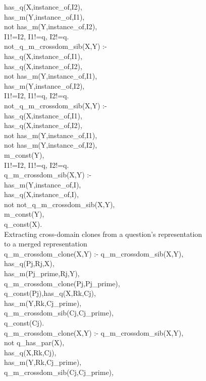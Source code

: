 has\_q(X,instance\_of,I2),\\
has\_m(Y,instance\_of,I1),\\
not has\_m(Y,instance\_of,I2),\\
I1!=I2, I1!=q, I2!=q.\\
not\_q\_m\_crossdom\_sib(X,Y) :-\\
has\_q(X,instance\_of,I1),\\
has\_q(X,instance\_of,I2),\\
not has\_m(Y,instance\_of,I1),\\
has\_m(Y,instance\_of,I2),\\
I1!=I2, I1!=q, I2!=q.\\
not\_q\_m\_crossdom\_sib(X,Y) :-\\
has\_q(X,instance\_of,I1),\\
has\_q(X,instance\_of,I2),\\
not has\_m(Y,instance\_of,I1),\\
not has\_m(Y,instance\_of,I2),\\
m\_const(Y),\\
I1!=I2, I1!=q, I2!=q.\\
q\_m\_crossdom\_sib(X,Y) :-\\
has\_m(Y,instance\_of,I),\\
has\_q(X,instance\_of,I),\\
not not\_q\_m\_crossdom\_sib(X,Y),\\
m\_const(Y),\\
q\_const(X).\\
Extracting cross-domain clones from a question’s representation\\
to a merged representation\\
q\_m\_crossdom\_clone(X,Y) :- q\_m\_crossdom\_sib(X,Y),\\
has\_q(Pj,Rj,X),\\
has\_m(Pj\_prime,Rj,Y),\\
q\_m\_crossdom\_clone(Pj,Pj\_prime),\\
q\_const(Pj),has\_q(X,Rk,Cj),\\
has\_m(Y,Rk,Cj\_prime),\\
q\_m\_crossdom\_sib(Cj,Cj\_prime),\\
q\_const(Cj).\\
q\_m\_crossdom\_clone(X,Y) :- q\_m\_crossdom\_sib(X,Y),\\
not q\_has\_par(X),\\
has\_q(X,Rk,Cj),\\
has\_m(Y,Rk,Cj\_prime),\\
q\_m\_crossdom\_sib(Cj,Cj\_prime),\\

